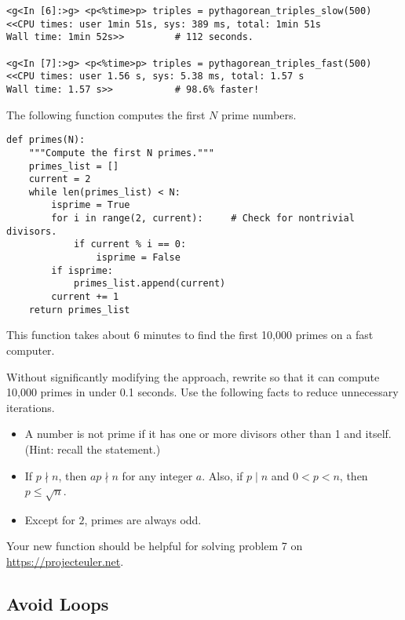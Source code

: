 \begin{lstlisting}
<g<In [6]:>g> <p<%time>p> triples = pythagorean_triples_slow(500)
<<CPU times: user 1min 51s, sys: 389 ms, total: 1min 51s
Wall time: 1min 52s>>         # 112 seconds.

<g<In [7]:>g> <p<%time>p> triples = pythagorean_triples_fast(500)
<<CPU times: user 1.56 s, sys: 5.38 ms, total: 1.57 s
Wall time: 1.57 s>>           # 98.6% faster!
\end{lstlisting}

\begin{problem}
The following function computes the first $N$ prime numbers.
\begin{lstlisting}
def primes(N):
    """Compute the first N primes."""
    primes_list = []
    current = 2
    while len(primes_list) < N:
        isprime = True
        for i in range(2, current):     # Check for nontrivial divisors.
            if current % i == 0:
                isprime = False
        if isprime:
            primes_list.append(current)
        current += 1
    return primes_list
\end{lstlisting}
This function takes about 6 minutes to find the first 10,000 primes on a fast computer.

Without significantly modifying the approach, rewrite  so that it can compute 10,000 primes in under 0.1 seconds.
Use the following facts to reduce unnecessary iterations.
\begin{itemize}
\item A number is not prime if it has one or more divisors other than 1 and itself.
\\(Hint: recall the  statement.)
\item If $p\nmid n$, then $ap\nmid n$ for any integer $a$.
Also, if $p \mid n$ and $0 < p < n$, then $p \le \sqrt{n}$.
\item Except for $2$, primes are always odd.
\end{itemize}
Your new function should be helpful for solving problem 7 on \url{https://projecteuler.net}.
\label{prob:profiling-primes-naive}
\end{problem}

\subsection*{Avoid Loops} %


